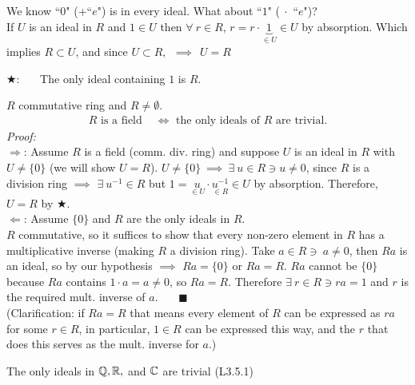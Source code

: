 We know ``$0$" (+``$e$") is in every ideal. What about ``$1$" ($\ \cdot$ ``$e$")? \\ If $U$ is an ideal in $R$ and $1\in U$ then $\forall \ r \in R$, $r=r\cdot \underbrace{1}_{\in U} \in U$ by absorption. Which implies $R\subset U$, and since $U\subset R,  \ \ \implies \ \ U=R$ \\
\begin{tcolorbox}[width=5in, center=true]
\begin{center}
$\bigstar$: \ \ \ The only ideal containing $1$ is $R$.
\end{center}
\end{tcolorbox}
\begin{lemma}
    $R$ commutative ring and $R\neq \emptyset$.
    \begin{align}
        R \text{ is a field } &\iff \text{ the only ideals of }R \text{ are trivial.} \nonumber
    \end{align}
    \textit{Proof:}\\
    $\Rightarrow$: Assume $R$ is a field (comm. div. ring) and suppose $U$ is an ideal in $R$ with $U\neq \{0\}$ (we will show $U=R$). $U\neq \{0\} \ \implies  \ \exists \ u \in R \ni u\neq 0$, since $R$ is a division ring $\implies$ $\exists \ u^{-1}\in R$ but $1=\underset{\in U}{u}\cdot \underset{\in R}{u^{-1}}\in U$ by absorption. Therefore, $U=R$ by $\bigstar$. \\ \steezybreak
    $\Leftarrow$: Assume $\{0\}$ and $R$ are the only ideals in $R$. \\
    $R$ commutative, so it suffices to show that every non-zero element in $R$ has a multiplicative inverse (making $R$ a division ring). Take $a\in R \ni \ a\neq 0$, then $Ra$ is an ideal, so by our hypothesis $\implies$ $Ra=\{0\}$ or $Ra=R$. $Ra$ cannot be $\{0\}$ because $Ra$ contains $1\cdot a = a \neq 0$, so $Ra=R$. Therefore $\exists \ r \in R \ni ra = 1$ and $r$ is the required mult. inverse of $a$. \ \ \ $\blacksquare$ \\ 

    \noindent (Clarification: if $Ra=R$ that means every element of $R$ can be expressed as $ra$ for some $r\in R$, in particular, $1\in R$ can be expressed this way, and the $r$ that does this serves as the mult. inverse for $a$.)
\end{lemma}
\begin{example}
    The only ideals in ${\mathbb{ Q}}, {\mathbb{ R}},$ and ${\mathbb{ C}}$ are trivial (L3.5.1)
\end{example}
